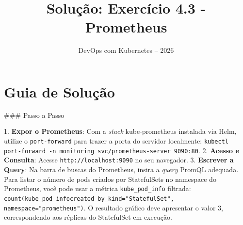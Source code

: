 \documentclass[11pt,a4paper]{article}
\title{\color{secondary}\Huge\textbf{Solução: Exercício 4.3 - Prometheus}}
\author{\color{primary}DevOps com Kubernetes -- 2026}
\date{}
\begin{document}
\maketitle

\section*{\color{primary}Guia de Solução}
\begin{tcolorbox}[colback=green!5!white,colframe=green!60!black,title=Resolução Passo a Passo]
### Passo a Passo

1. \textbf{Expor o Prometheus}: Com a \textit{stack} kube-prometheus instalada via Helm, utilize o \texttt{port-forward} para trazer a porta do servidor localmente: \texttt{kubectl port-forward -n monitoring svc/prometheus-server 9090:80}.
2. \textbf{Acesso e Consulta}: Acesse \texttt{http://localhost:9090} no seu navegador.
3. \textbf{Escrever a Query}: Na barra de buscas do Prometheus, insira a \textit{query} PromQL adequada. Para listar o número de pods criados por StatefulSets no namespace do Prometheus, você pode usar a métrica \texttt{kube_pod_info} filtrada: \texttt{count(kube_pod_info{created_by_kind="StatefulSet", namespace="prometheus"})}. O resultado gráfico deve apresentar o valor 3, correspondendo aos réplicas do StatefulSet em execução.
\end{tcolorbox}
\end{document}
